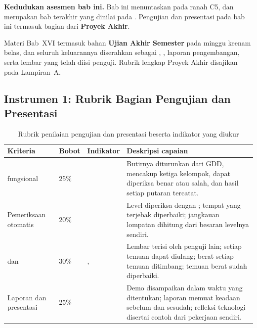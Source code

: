 \label{sec:asesmen-playtest}

\begin{asesmenbox}
\textbf{Kedudukan asesmen bab ini.} Bab ini menuntaskan  pada
ranah C5, dan merupakan bab terakhir yang dinilai pada . Pengujian dan
presentasi pada bab ini termasuk bagian dari \textbf{Proyek Akhir}.

\vspace{0.4em}
Materi Bab~XVI termasuk bahan \textbf{Ujian Akhir Semester} pada minggu keenam
belas, dan seluruh keluarannya diserahkan sebagai ,
, laporan pengembangan, serta lembar 
yang telah diisi penguji. Rubrik lengkap Proyek Akhir disajikan pada
Lampiran~A.
\end{asesmenbox}

\subsection*{Instrumen 1: Rubrik Bagian Pengujian dan Presentasi}

\begin{table}[htbp]
\centering
\caption{Rubrik penilaian pengujian dan presentasi beserta indikator yang diukur}
\label{tab:rubrik-praktikum-16}
{\setlength{\tabcolsep}{4pt}\footnotesize%
\begin{tabularx}{\textwidth}{@{}L{3.2cm} C{1.3cm} C{2.1cm} Y@{}}
\toprule
\headrow \textbf{Kriteria} & \textbf{Bobot} & \textbf{Indikator} & \textbf{Deskripsi capaian} \\
\midrule
{} fungsional & 25\% &  &
Butirnya diturunkan dari GDD, mencakup ketiga kelompok, dapat diperiksa benar
atau salah, dan hasil setiap putaran tercatat. \\
\addlinespace
Pemeriksaan otomatis & 20\% &  &
Level diperiksa dengan ; tempat yang terjebak
diperbaiki; jangkauan lompatan dihitung dari besaran levelnya sendiri. \\
\addlinespace
{} dan  & 30\% & ,  &
Lembar  terisi oleh penguji lain; setiap temuan dapat
diulang; berat setiap temuan ditimbang; temuan berat sudah diperbaiki. \\
\addlinespace
Laporan dan presentasi & 25\% &  &
Demo disampaikan dalam waktu yang ditentukan; laporan memuat keadaan sebelum
dan sesudah; refleksi teknologi disertai contoh dari pekerjaan sendiri. \\
\bottomrule
\end{tabularx}}
\end{table}

